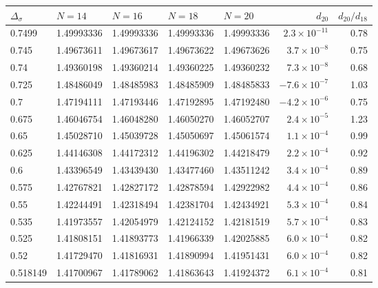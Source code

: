 \begin{tabular}{@{}l llll r r@{}}
\toprule
$\Delta_\sigma$ & $N=14$ & $N=16$ & $N=18$ & $N=20$ & $d_{20}$ & $d_{20}/d_{18}$\\
\midrule
0.7499 & 1.49993336 & 1.49993336 & 1.49993336 & 1.49993336 & $2.3\times10^{-11}$ & 0.78\\
0.745 & 1.49673611 & 1.49673617 & 1.49673622 & 1.49673626 & $3.7\times10^{-8}$ & 0.75\\
0.74 & 1.49360198 & 1.49360214 & 1.49360225 & 1.49360232 & $7.3\times10^{-8}$ & 0.68\\
0.725 & 1.48486049 & 1.48485983 & 1.48485909 & 1.48485833 & $-7.6\times10^{-7}$ & 1.03\\
0.7 & 1.47194111 & 1.47193446 & 1.47192895 & 1.47192480 & $-4.2\times10^{-6}$ & 0.75\\
0.675 & 1.46046754 & 1.46048280 & 1.46050270 & 1.46052707 & $2.4\times10^{-5}$ & 1.23\\
0.65 & 1.45028710 & 1.45039728 & 1.45050697 & 1.45061574 & $1.1\times10^{-4}$ & 0.99\\
0.625 & 1.44146308 & 1.44172312 & 1.44196302 & 1.44218479 & $2.2\times10^{-4}$ & 0.92\\
0.6 & 1.43396549 & 1.43439430 & 1.43477460 & 1.43511242 & $3.4\times10^{-4}$ & 0.89\\
0.575 & 1.42767821 & 1.42827172 & 1.42878594 & 1.42922982 & $4.4\times10^{-4}$ & 0.86\\
0.55 & 1.42244491 & 1.42318494 & 1.42381704 & 1.42434921 & $5.3\times10^{-4}$ & 0.84\\
0.535 & 1.41973557 & 1.42054979 & 1.42124152 & 1.42181519 & $5.7\times10^{-4}$ & 0.83\\
0.525 & 1.41808151 & 1.41893773 & 1.41966339 & 1.42025885 & $6.0\times10^{-4}$ & 0.82\\
0.52 & 1.41729470 & 1.41816931 & 1.41890994 & 1.41951431 & $6.0\times10^{-4}$ & 0.82\\
0.518149 & 1.41700967 & 1.41789062 & 1.41863643 & 1.41924372 & $6.1\times10^{-4}$ & 0.81\\
\bottomrule
\end{tabular}
